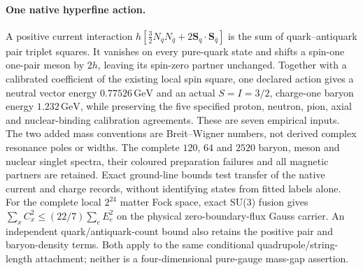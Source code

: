 \paragraph{One native hyperfine action.}
A positive current interaction
$h[\tfrac32N_qN_{\bar q}+2\mathbf S_q\cdot\mathbf S_{\bar q}]$
is the sum of quark--antiquark pair triplet squares. It vanishes on every
pure-quark state and shifts a spin-one one-pair meson by $2h$, leaving its
spin-zero partner unchanged. Together with a calibrated coefficient of the
existing local spin square, one declared action gives a neutral vector
energy $0.77526\,\mathrm{GeV}$ and an actual $S=I=3/2$, charge-one baryon
energy $1.232\,\mathrm{GeV}$, while preserving the five specified proton,
neutron, pion, axial and nuclear-binding calibration agreements. These are
seven empirical inputs. The two added mass conventions are Breit--Wigner
numbers, not derived complex resonance poles or widths.
The complete $120$, $64$ and $2520$ baryon, meson and nuclear singlet
spectra, their coloured preparation failures and all magnetic partners are
retained. Exact ground-line bounds test transfer of the native current and
charge records, without identifying states from fitted labels alone.
For the complete local $2^{24}$ matter Fock space, exact SU(3) fusion gives
$\sum_x C_x^2\leq(22/7)\sum_e E_e^2$ on the physical zero-boundary-flux
Gauss carrier. An independent quark/antiquark-count bound also retains the
positive pair and baryon-density terms. Both apply to the same conditional
quadrupole/string-length attachment; neither is a four-dimensional
pure-gauge mass-gap assertion.

